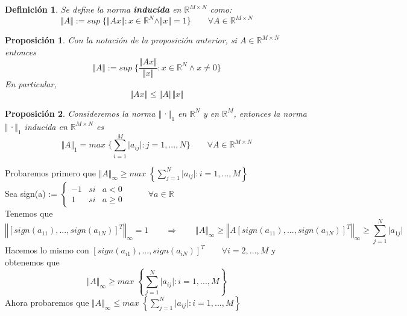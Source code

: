 \documentclass[10pt, a4paper]{article}
\makeatletter
\renewenvironment{proof}[1][\proofname] {\par\pushQED{\qed}\normalfont\topsep6\p@\@plus6\p@\relax\trivlist\item[\hskip\labelsep\itshape\sffamily#1\@addpunct{.}]\ignorespaces}{\popQED\endtrivlist\@endpefalse}
\theoremstyle{theorem-style}
\newtheorem{nprop}{Proposición}[section]
\theoremstyle{definition-style}
\newtheorem{ndef}{Definición}[section]
\theoremstyle{remark-style}
\theoremstyle{example-style}
\theoremstyle{definition-style}
\theoremstyle{remark-style}
\makeatother
\begin{document}
\begin{proof}
\end{proof}

\begin{ndef}
Se define la norma \textbf{inducida} en $\mathbb{R}^{M \times N}$ como:
\[ \Vert A \Vert := sup \; \lbrace \Vert Ax \Vert : x \in \mathbb{R}^N \wedge \Vert x \Vert = 1 \rbrace \qquad \forall A \in \mathbb{R}^{M \times N} \]
\end{ndef}

\begin{nprop}
Con la notación de la proposición anterior, si $A \in \mathbb{R}^{M \times N}$ entonces
\[ \Vert A \Vert := sup \; \lbrace \frac{\Vert Ax \Vert}{\Vert x \Vert } : x \in \mathbb{R}^N \wedge x \neq 0 \rbrace \]
En particular,
\[ \Vert Ax \Vert \leq \Vert A \Vert \Vert x \Vert \]
\end{nprop}

\begin{proof}
\end{proof}

\begin{nprop}
Consideremos la norma $\Vert$·$\Vert _1$ en $\mathbb{R}^N$ y en $\mathbb{R}^M$, entonces la norma $\Vert$·$\Vert _1$ inducida en $\mathbb{R}^{M \times N}$ es
\[ \Vert A \Vert _1 = max \; \lbrace \sum_{i=1}^M \vert a_{ij} \vert : j = 1,...,N \rbrace \qquad \forall A \in \mathbb{R}^{M \times N} \]
\end{nprop}

\begin{proof}
Probaremos primero que $ \Vert A \Vert _\infty \geq max \; \left\lbrace \sum_{j=1}^N \vert a_{ij} \vert : i = 1,...,M \right\rbrace $\\
Sea sign(a) := $\left\{ \begin{array}{lcc}
-1 & si & a < 0 \\
1 & si & a \geq 0
\end{array}
\right.$ $\qquad$ $\forall a \in \mathbb{R}$\\
Tenemos que
\[ \left\Vert \left[ sign(a_{11}),...,sign(a_{1N}) \right] ^T \right\Vert _\infty = 1 \qquad \Rightarrow \qquad \Vert A \Vert _\infty \geq \left\Vert A \left[ sign(a_{11}),...,sign(a_{1N}) \right] ^T \right\Vert _\infty \geq \sum_{j=1}^N \vert a_{1j} \vert \]
Hacemos lo mismo con $\left[ sign(a_{i1}),...,sign(a_{iN}) \right] ^T \qquad \forall i = 2,...,M$ y obtenemos que
\[ \Vert A \Vert _\infty \geq max \; \left\lbrace \sum_{j=1}^N \vert a_{ij} \vert : i = 1,...,M \right\rbrace \]
Ahora probaremos que $ \Vert A \Vert _\infty \leq max \; \left\lbrace \sum_{j=1}^N \vert a_{ij} \vert : i = 1,...,M \right\rbrace $\\
\end{proof}
\end{document}
